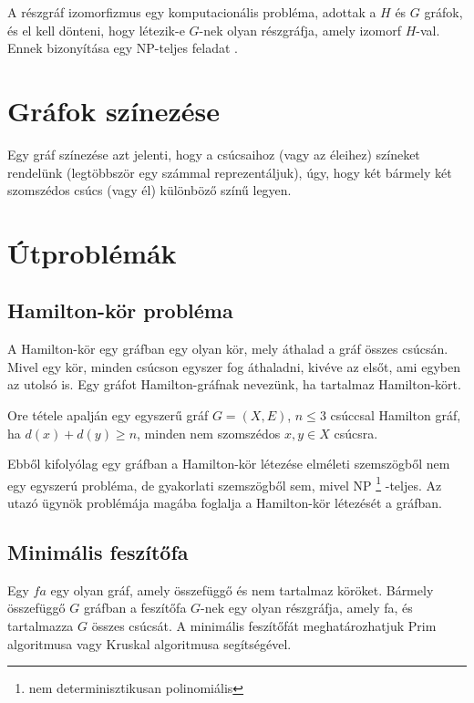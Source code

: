 A részgráf izomorfizmus egy komputacionális probléma, adottak a \(H\) és \(G\) gráfok, és el kell dönteni, hogy létezik-e \(G\)-nek olyan részgráfja, amely izomorf \(H\)-val. Ennek bizonyítása egy NP-teljes feladat \cite{gt_problem}.

\section{Gráfok színezése}\label{sec:ALAP:adatelem}

Egy gráf színezése azt jelenti, hogy a csúcsaihoz (vagy az éleihez) színeket rendelünk (legtöbbször egy számmal reprezentáljuk), úgy, hogy két bármely két szomszédos csúcs (vagy él) különböző színű legyen.

\section{Útproblémák}\label{sec:ALAP:adatelem}

\subsection{Hamilton-kör probléma}

A Hamilton-kör egy gráfban egy olyan kör, mely áthalad a gráf összes csúcsán. Mivel egy kör, minden csúcson egyszer fog áthaladni, kivéve az elsőt, ami egyben az utolsó is. Egy gráfot Hamilton-gráfnak nevezünk, ha tartalmaz Hamilton-kört.

Ore tétele apalján egy egyszerű gráf \(G = (X,E)\), \(n \leq 3\) csúccsal Hamilton gráf, ha \(d(x) + d(y)  \geq n\), minden nem szomszédos \(x,y \in X\) csúcsra.

Ebből kifolyólag egy gráfban a Hamilton-kör létezése elméleti szemszögből nem egy egyszerú probléma, de gyakorlati szemszögből sem, mivel NP%
\footnote{ %
	nem determinisztikusan polinomiális
}  %
-teljes. Az utazó ügynök problémája magába foglalja a Hamilton-kör létezését a gráfban.

\subsection{Minimális feszítőfa}

Egy \(fa\) egy olyan gráf, amely összefüggő és nem tartalmaz köröket. Bármely összefüggő \(G\) gráfban a feszítőfa \(G\)-nek egy olyan részgráfja, amely fa, és tartalmazza \(G\) összes csúcsát. A minimális feszítőfát meghatározhatjuk Prim algoritmusa vagy Kruskal algoritmusa segítségével.

